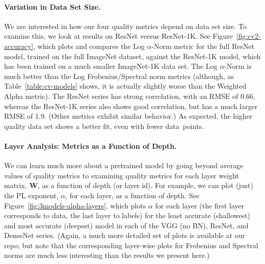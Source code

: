 \vspace{-1mm}
\paragraph{Variation in Data Set Size.}

We are interested in how our four quality metrics depend on data set size.
To examine this, we look at results on ResNet versus ResNet-1K.
See Figure~\ref{fig:cv2-accuracy}, which plots and compares the Log $\alpha$-Norm metric 
for the full ResNet model, trained on the full ImageNet dataset, against the ResNet-1K model, which has been trained on a much smaller ImageNet-1K data set.
The Log $\alpha$-Norm is much better than the Log Frobenius/Spectral norm metrics (although, as Table~\ref{table:cv-models} shows, it is actually slightly worse than the Weighted Alpha metric).
The ResNet series has strong correlation, with an RMSE of $0.66$, whereas the ResNet-1K series also shows good correlation, but has a much larger RMSE of $1.9$.
(Other metrics exhibit similar behavior.)
As expected, the higher quality data set shows a better fit, even with fewer data~points.


\vspace{-1mm}
\paragraph{Layer Analysis: Metrics as a Function of Depth.}

We can learn much more about a pretrained model by going beyond average values of quality metrics to examining quality metrics for each layer weight matrix, $\mathbf{W}$, as a function of depth (or layer id).  %
For example, we can 
plot (just) the PL exponent, $\alpha$, for each layer, %
as a function of depth.
%
See Figure~\ref{fig:3models-alpha-layers}, which plots $\alpha$ for each layer (the first layer corresponds to data, the last layer to labels) for the least accurate (shallowest) and most accurate (deepest) model in each of the VGG (no BN), ResNet, and DenseNet series.
(Again, a much more detailed set of plots is available at our repo; but note that the corresponding layer-wise plots for Frobenius and Spectral norms are much less interesting than the results we present here.)

